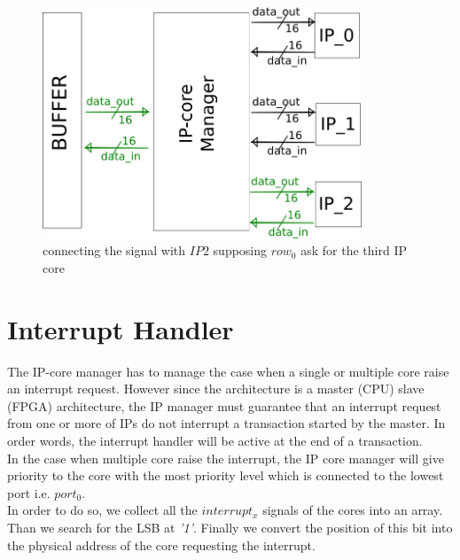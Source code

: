 \begin{figure}[h!]
	\centering	
	\includegraphics[width=0.85\textwidth]{imm/ip_func/x_switch33.png}  
	\caption{connecting the signal with $ IP2 $ supposing $ row_0 $ ask for the third IP core} 
	\label{fig:x_switch2}
\end{figure}

\clearpage
\section{Interrupt Handler}
The IP-core manager has to manage the case when a single or multiple core raise an interrupt request. 
However since the architecture is a master (CPU) slave (FPGA) architecture, the IP manager must guarantee that an interrupt request from one or more of IPs do not interrupt a transaction started by the master. In order words, the interrupt handler will be active at the end of a transaction.\\
In the case when multiple core raise the interrupt, the IP core manager will give priority to the core with the most priority level which is connected to the lowest port i.e. $ port_0 $.\\
In order to do so, we collect all the $ interrupt_x $ signals of the cores into an array. Than we search for the LSB at \textit{'1'}. Finally we convert the position of this bit into the physical address of the core requesting the interrupt.\\

